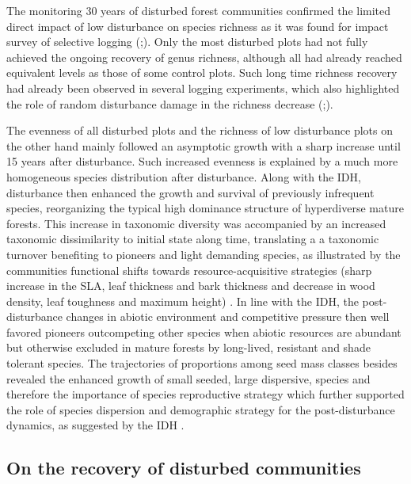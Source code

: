 \documentclass[fleqn,10pt]{ArtEcoFoG} %
\theoremstyle{definition}
\theoremstyle{definition}
\theoremstyle{definition}
\theoremstyle{remark}
\begin{document}
The monitoring 30 years of disturbed forest communities confirmed the
limited direct impact of low disturbance on species richness as it was
found for impact survey of selective logging
(\citet{Cannon1998};\citet{Baraloto2010}). Only the most disturbed plots
had not fully achieved the ongoing recovery of genus richness, although
all had already reached equivalent levels as those of some control
plots. Such long time richness recovery had already been observed in
several logging experiments, which also highlighted the role of random
disturbance damage in the richness decrease
(\citet{deAvila2015};\citet{Hu2018}).

The evenness of all disturbed plots and the richness of low disturbance
plots on the other hand mainly followed an asymptotic growth with a
sharp increase until 15 years after disturbance. Such increased evenness
is explained by a much more homogeneous species distribution after
disturbance. Along with the IDH, disturbance then enhanced the growth
and survival of previously infrequent species, reorganizing the typical
high dominance structure of hyperdiverse mature forests. This increase
in taxonomic diversity was accompanied by an increased taxonomic
dissimilarity to initial state along time, translating a a taxonomic
turnover benefiting to pioneers and light demanding species, as
illustrated by the communities functional shifts towards
resource-acquisitive strategies (sharp increase in the SLA, leaf
thickness and bark thickness and decrease in wood density, leaf
toughness and maximum height)
\citep{Westoby1998, Wright2004, Reich2014}. In line with the IDH, the
post-disturbance changes in abiotic environment and competitive pressure
then well favored pioneers outcompeting other species when abiotic
resources are abundant but otherwise excluded in mature forests by
long-lived, resistant and shade tolerant species. The trajectories of
proportions among seed mass classes besides revealed the enhanced growth
of small seeded, large dispersive, species and therefore the importance
of species reproductive strategy which further supported the role of
species dispersion and demographic strategy for the post-disturbance
dynamics, as suggested by the IDH
\citep{TerSteege2001, Flores2006, Haddad2008}.

\subsection{On the recovery of disturbed
communities}\label{on-the-recovery-of-disturbed-communities}
\end{document}
